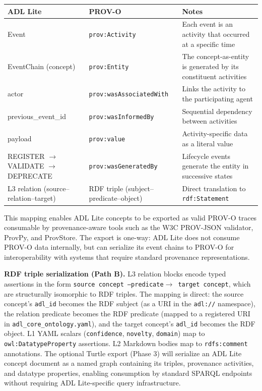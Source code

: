 \begin{longtable}[]{@{}>{\raggedright\arraybackslash}p{}
  >{\raggedright\arraybackslash}p{}
  >{\raggedright\arraybackslash}p{}@{}}
\toprule
ADL Lite
& PROV-O
& Notes
\\
\midrule
\endhead
\bottomrule
\endlastfoot
Event & \texttt{prov:Activity} & Each event is an activity that occurred at a specific time \\
EventChain (concept) & \texttt{prov:Entity} & The concept-as-entity is generated by its constituent activities \\
actor & \texttt{prov:wasAssociatedWith} & Links the activity to the participating agent \\
previous\_event\_id & \texttt{prov:wasInformedBy} & Sequential dependency between activities \\
payload & \texttt{prov:value} & Activity-specific data as a literal value \\
REGISTER $\rightarrow$ VALIDATE $\rightarrow$ DEPRECATE & \texttt{prov:wasGeneratedBy} & Lifecycle events generate the entity in successive states \\
L3 relation (source--relation--target) & RDF triple (subject--predicate--object) & Direct translation to \texttt{rdf:Statement} \\
\end{longtable}

This mapping enables ADL Lite concepts to be exported as valid PROV-O traces consumable by provenance-aware tools such as the W3C PROV-JSON validator, ProvPy, and ProvStore. The export is one-way: ADL Lite does not consume PROV-O data internally, but can serialize its event chains to PROV-O for interoperability with systems that require standard provenance representations.

\textbf{RDF triple serialization (Path B).} L3 relation blocks encode typed assertions in the form \texttt{source\ concept\ ---predicate$\rightarrow$\ target\ concept}, which are structurally isomorphic to RDF triples. The mapping is direct: the source concept's \texttt{adl\_id} becomes the RDF subject (as a URI in the \texttt{adl://} namespace), the relation predicate becomes the RDF predicate (mapped to a registered URI in \texttt{adl\_core\_ontology.yaml}), and the target concept's \texttt{adl\_id} becomes the RDF object. L1 YAML scalars (\texttt{confidence}, \texttt{novelty}, \texttt{domain}) map to \texttt{owl:DatatypeProperty} assertions. L2 Markdown bodies map to \texttt{rdfs:comment} annotations. The optional Turtle export (Phase 3) will serialize an ADL Lite concept document as a named graph containing its triples, provenance activities, and datatype properties, enabling consumption by standard SPARQL endpoints without requiring ADL Lite-specific query infrastructure.

